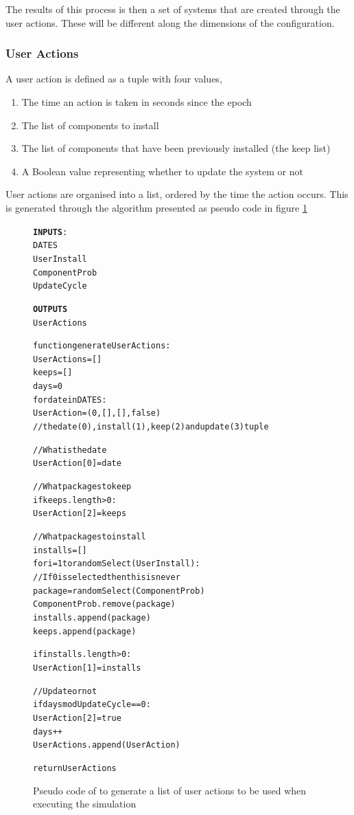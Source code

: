 The results of this process is then a set of systems that are created through the user actions.
These will be different along the dimensions of the configuration.

\subsubsection{User Actions}
A user action is defined as a tuple with four values,
\begin{enumerate}
  \item The time an action is taken in seconds since the epoch
  \item The list of components to install
  \item The list of components that have been previously installed (the keep list)
  \item A Boolean value representing whether to update the system or not
\end{enumerate}

User actions are organised into a list, ordered by the time the action occurs.
This is generated through the algorithm presented as pseudo code in figure \ref{generateuser}

\begin{figure}[htp]
\begin{center}
\begin{alltt}
\textbf{INPUTS}:
DATES
UserInstall
ComponentProb
UpdateCycle

\textbf{OUTPUTS}
UserActions

function generateUserActions: 
    UserActions = []
    keeps = []
    days = 0
    for date in DATES:
        UserAction = (0, [], [], false) 
        //the date(0), install(1), keep(2) and update(3) tuple
        
        //What is the date
        UserAction[0] = date
        
        //What packages to keep
        if keeps.length > 0:
            UserAction[2] = keeps 
            
        //What packages to install
        installs = []
        for i = 1 to randomSelect(UserInstall):
            //If 0 is selected then this is never
            package = randomSelect(ComponentProb)
            ComponentProb.remove(package)
            installs.append(package)
            keeps.append(package)
            
        if installs.length > 0:
            UserAction[1] = installs 
        
        //Update or not
        if days mod UpdateCycle == 0:
            UserAction[2] = true
        days++
        UserActions.append(UserAction)
        
    return UserActions
\end{alltt}
\caption[generateUser script]{Pseudo code of to generate a list of user actions to be used when executing the simulation}
\label{generateuser}
\end{center}
\end{figure}



